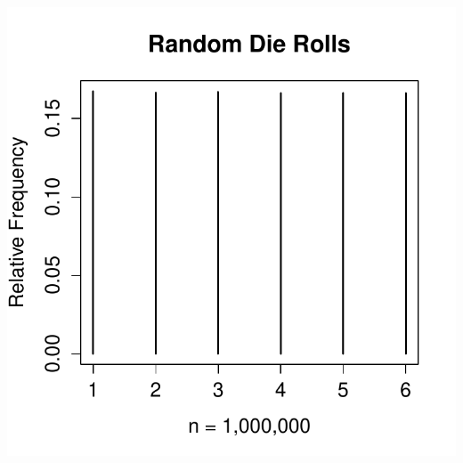 \documentclass[handout]{beamer}
\begin{document}
\begin{frame}

\centering
\includegraphics[scale = 0.7]{./images/die4}

\end{frame}
\end{document}
